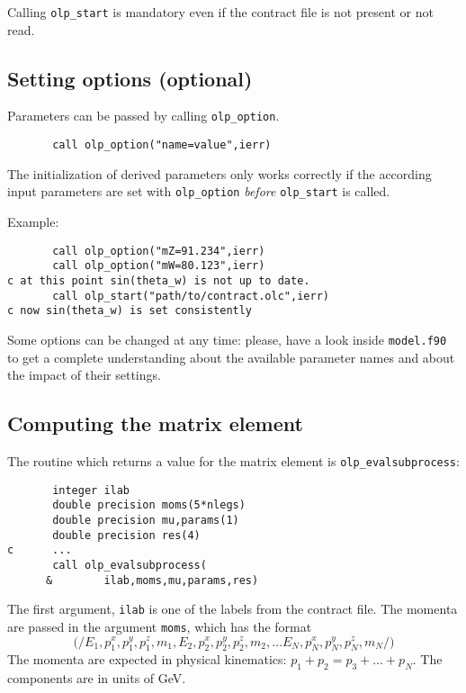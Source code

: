 \attention Calling \texttt{olp\_start} is mandatory even if the contract
file is not present or not read.

\subsection{Setting options (optional)}
Parameters can be passed by calling \texttt{olp\_option}.
\begin{lstlisting}
       call olp_option("name=value",ierr)
\end{lstlisting}

\attention The initialization of derived parameters only works correctly
if the according input parameters are set with \texttt{olp\_option}
\emph{before} \texttt{olp\_start} is called.

Example:
\begin{lstlisting}
       call olp_option("mZ=91.234",ierr)
       call olp_option("mW=80.123",ierr)
c at this point sin(theta_w) is not up to date.
       call olp_start("path/to/contract.olc",ierr)
c now sin(theta_w) is set consistently
\end{lstlisting}

Some options can be changed at any time: please, have a look inside
\texttt{model.f90} to get a complete understanding about the available
parameter names and about the impact of their settings.

\subsection{Computing the matrix element}
The routine which returns a value for the matrix element is
\texttt{olp\_evalsubprocess}:
\begin{lstlisting}
       integer ilab
       double precision moms(5*nlegs)
       double precision mu,params(1)
       double precision res(4)
c      ...
       call olp_evalsubprocess(
      &        ilab,moms,mu,params,res)
\end{lstlisting}

The first argument, \texttt{ilab} is one of the labels from the
contract file. The momenta are passed in the argument \texttt{moms},
which has the format
\begin{displaymath}
\mathtt{(/}
E_1, p^x_1, p^y_1, p^z_1, m_1,
E_2, p^x_2, p^y_2, p^z_2, m_2, \ldots
E_N, p^x_N, p^y_N, p^z_N, m_N
\mathtt{/)}
\end{displaymath}
The momenta are expected in physical kinematics: $p_1+p_2=p_3+\ldots+p_N$.
The components are in units of GeV.

